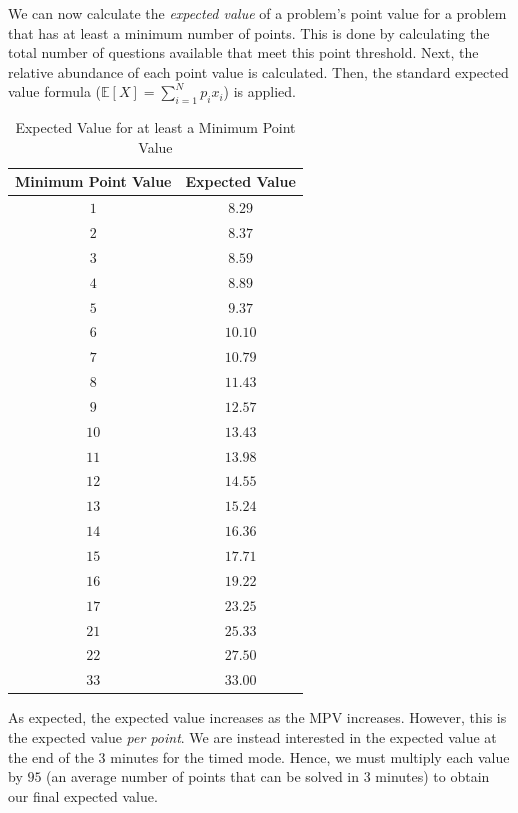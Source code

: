 \documentclass{article}
\begin{document}
We can now calculate the \textit{expected value} of a problem's point value for a problem that has at least a minimum number of points. This is done by calculating the total number of questions available that meet this point threshold. Next, the relative abundance of each point value is calculated. Then, the standard expected value formula ($\mathbb{E}[X] = \sum_{i=1}^{N} p_i x_i$) is applied.
\begin{table}[H]
    \begin{tabular}{|c|c|}
        \hline
        \textbf{Minimum Point Value} & \textbf{Expected Value} \\
        \hline
        \hline
    
        $1$ & $8.29$ \\
        $2$ & $8.37$ \\
        $3$ & $8.59$ \\
        $4$ & $8.89$ \\
        $5$ & $9.37$ \\
        $6$ & $10.10$ \\
        $7$ & $10.79$ \\
        $8$ & $11.43$ \\
        $9$ & $12.57$ \\
        $10$ & $13.43$ \\
        $11$ & $13.98$ \\
        $12$ & $14.55$ \\
        $13$ & $15.24$ \\
        $14$ & $16.36$ \\
        $15$ & $17.71$ \\
        $16$ & $19.22$ \\
        $17$ & $23.25$ \\
        $21$ & $25.33$ \\
        $22$ & $27.50$ \\
        $33$ & $33.00$ \\

        \hline
    \end{tabular}
    \centering
    \caption{Expected Value for at least a Minimum Point Value}\label{table:expected_value}
\end{table}

As expected, the expected value increases as the MPV increases. However, this is the expected value \textit{per point}. We are instead interested in the expected value at the end of the 3 minutes for the timed mode. Hence, we must multiply each value by $95$ (an average number of points that can be solved in 3 minutes) to obtain our final expected value.
\end{document}
